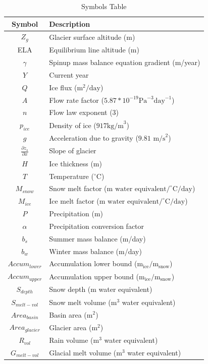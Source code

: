 \documentclass{article}
\begin{document}
\begin{table}[h!]
    \centering
    \begin{tabularx}{\textwidth}{|c|X|}
        \hline
        Symbol & Description \\
        \hline
        $Z_g$ & Glacier surface altitude (m) \\
        ELA & Equilibrium line altitude (m)\\
        $\gamma$ & Spinup mass balance equation gradient (m/year)\\
        $Y$ & Current year \\
        $Q$ & Ice flux ($\text{m}^2/\text{day}$)\\
        $A$ & Flow rate factor ($5.87*10^{-19}\text{Pa}^{-3}\text{day}^{-1}$) \\
        $n$ & Flow law exponent (3) \\
        $p_{ice}$ & Density of ice ($917\text{kg/m}^3$) \\
        $g$ & Acceleration due to gravity ($9.81\text{ m/s}^2$) \\
        $\frac{\partial z_s}{\partial x}$ & Slope of glacier \\
        $H$ & Ice thickness (m)\\
        $T$ & Temperature ($^\circ$C) \\
        $M_{snow}$ & Snow melt factor ($\text{m water equivalent}/^\circ\text{C}/\text{day}$) \\
        $M_{ice}$ & Ice melt factor ($\text{m water equivalent}/^\circ\text{C}/\text{day}$) \\
        $P$ & Precipitation (m) \\
        $\alpha$ & Precipitation conversion factor \\
        $b_s$ & Summer mass balance (m/day) \\
        $b_w$ & Winter mass balance (m/day) \\
        ${Accum}_{lower}$ & Accumulation lower bound ($\text{m}_{\text{ice}}/\text{m}_{\text{snow}}$) \\
        ${Accum}_{upper}$ & Accumulation upper bound ($\text{m}_{\text{ice}}/\text{m}_{\text{snow}}$) \\
        $S_{depth}$ & Snow depth (m water equivalent) \\
        $S_{melt-vol}$ & Snow melt volume ($\text{m}^3$ water equivalent) \\
        ${Area}_{basin}$ & Basin area ($\text{m}^2$) \\
        ${Area}_{glacier} $ & Glacier area ($\text{m}^2$) \\
        $R_{vol}$ & Rain volume ($\text{m}^3$ water equivalent) \\
        $G_{melt-vol}$ & Glacial melt volume ($\text{m}^3$ water equivalent) \\
        \hline
    \end{tabularx}
    \caption{Symbols Table}
    \label{tab:symbols_table}
\end{table}
\FloatBarrier
\end{document}
